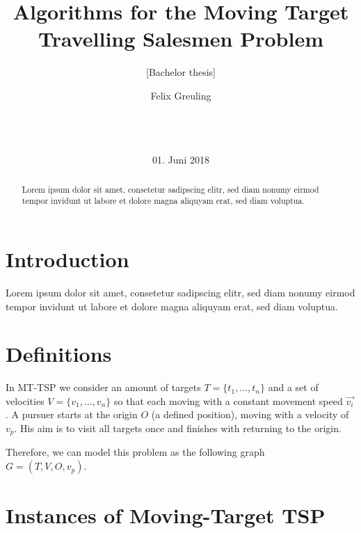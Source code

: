 \documentclass{acm_proc_article-sp}
\begin{document}
\title{Algorithms for the Moving Target Travelling Salesmen Problem}
\subtitle{[Bachelor thesis]}
\author{
\alignauthor
Felix Greuling\\
       \\ 
       \\
       \\ 
}
\date{01. Juni 2018}
\maketitle

\begin{abstract}
Lorem ipsum dolor sit amet, consetetur sadipscing elitr, sed diam nonumy eirmod tempor invidunt ut labore et dolore magna aliquyam erat, sed diam voluptua.
\end{abstract}

\section{Introduction}
Lorem ipsum dolor sit amet, consetetur sadipscing elitr, sed diam nonumy eirmod tempor invidunt ut labore et dolore magna aliquyam erat, sed diam voluptua.

\section{Definitions}
In MT-TSP we consider an amount of targets $T=\{t_1,...,t_n\}$ and a set of velocities $V=\{v_1,...,v_n\}$ so that each moving with a constant movement speed $\overrightarrow{v_i}$. A pursuer starts at the origin $O$ (a defined position), moving with a velocity of $v_p$. His aim is to visit all targets once and finishes with returning to the origin.

Therefore, we can model this problem as the following graph \\
$G=(T, V, O, v_p)$. 

\section{Instances of Moving-Target TSP}
\end{document}
